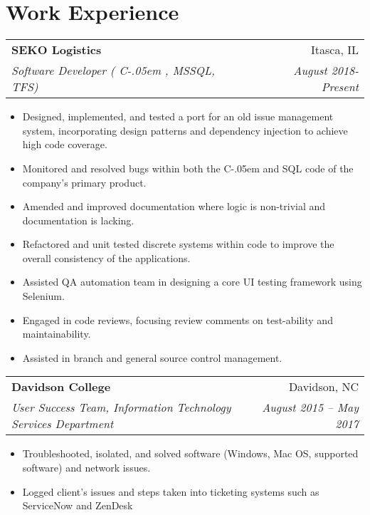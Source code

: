 \documentclass[letterpaper,11pt]{article}
\makeatletter
\newcommand{\resumeItem}[2]{
    \vspace{-2pt}
    \item\small{
        \textbf{#1}{ #2 \vspace{-2pt}}
    }
}
\newcommand{\resumeSubheading}[4]{
        \begin{tabular*}{0.97\textwidth}{l@{\extracolsep{\fill}}r}
            \textbf{#1} & #2 \\
            \textit{\small#3} & \textit{\small #4} \\
        \end{tabular*}
}
\newcommand{\resumeSubHeadingListStart}{}
\newcommand{\resumeSubHeadingListEnd}{}
\newcommand{\resumeItemListStart}{\begin{itemize}}
\newcommand{\resumeItemListEnd}{\end{itemize}}
\newcommand{\Csharp}{%
  {\settoheight{\dimen0}{C}C\kern-.05em \resizebox{!}{\dimen0}{\raisebox{\depth}{\#}}}}
\makeatother
\begin{document}
\section{\textbf{Work Experience}}
    \resumeSubHeadingListStart
        \resumeSubheading
            {SEKO Logistics}{Itasca, IL}
            {Software Developer (\Csharp, MSSQL, TFS)}{August 2018-Present}
            \resumeItemListStart
                \resumeItem{}
                    {
                        Designed, implemented, and tested a port for
                        an old issue management system, incorporating
                        design patterns and dependency injection to achieve high code coverage.
                    }
                \resumeItem{}
                    {
                        Monitored and resolved bugs within both the \Csharp \space and SQL code of the company's primary product.
                    }
                \resumeItem{}
                    {
                        Amended and improved documentation where logic
                        is non-trivial and documentation is lacking.
                    }
                \resumeItem{}
                    {
                        Refactored and unit tested discrete systems 
                        within code to improve the overall consistency 
                        of the applications.
                    }
                \resumeItem{}
                    {
                        Assisted QA automation team in designing a core UI testing framework using Selenium.
                    }
                \resumeItem{}
                    {
                        Engaged in code reviews,
                        focusing review comments on test-ability and maintainability.
                    }
                \resumeItem{}
                    {
                        Assisted in branch and general source control management.
                    }
            \resumeItemListEnd
        \resumeSubheading
            {Davidson College}{Davidson, NC}
            {User Success Team, Information Technology Services Department}{August 2015 -- May 2017}
            \resumeItemListStart
                \resumeItem{}
                    {Troubleshooted, isolated, and solved software (Windows, Mac OS, supported software) and network issues.}
                \resumeItem{}
                    {Logged client's issues and steps taken into ticketing systems such as ServiceNow and ZenDesk}
            \resumeItemListEnd
    \resumeSubHeadingListEnd
\end{document}
